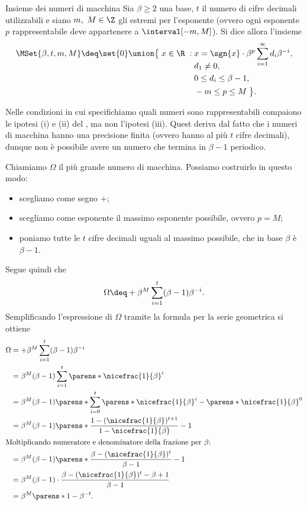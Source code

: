 \begin{definition}
    {Insieme dei numeri di macchina}
    Sia $\beta \geq 2$ una base, $t$ il numero di cifre decimali utilizzabili e siano $m,\ M \in \Z$ gli estremi per l'esponente (ovvero ogni esponente $p$ rappresentabile deve appartenere a $\interval[{-m, M}]$). Si dice allora  l'insieme\[
        \MSet{\beta, t, m, M} \deq \set{0} \union
        \begin{aligned}[t]
            \big\{\; x \in \R \;:\; &x = \sgn{x}\cdot\beta^p\sum_{i=1}^\infty d_i\beta^{-i},\\[-1em]
            &d_1 \neq 0,\\
            &0 \leq d_i \leq \beta-1,\\ 
            &-m \leq p \leq M \;\big\}.
        \end{aligned}
    \] 
\end{definition}

\begin{remark}
    Nelle condizioni in cui specifichiamo quali numeri sono rappresentabili compaiono le ipotesi (i) e (ii) del , ma non l'ipotesi (iii). Quest deriva dal fatto che i numeri di macchina hanno una precisione finita (ovvero hanno al più $t$ cifre decimali), dunque non è possibile avere un numero che termina in $\beta-1$ periodico.
\end{remark}

 Chiamiamo $\Omega$ il più grande numero di macchina. Possiamo costruirlo in questo modo: \begin{itemize}
    \item scegliamo come segno $+$;
    \item scegliamo come esponente il massimo esponente possibile, ovvero $p = M$;
    \item poniamo tutte le $t$ cifre decimali uguali al massimo possibile, che in base $\beta$ è $\beta-1$. 
\end{itemize} Segue quindi che \[
    \Omega \deq +\beta^M\sum_{i=1}^t (\beta-1)\beta^{-i}.
\] Semplificando l'espressione di $\Omega$ tramite la formula per la serie geometrica si ottiene \begin{align*}
    \Omega &= +\beta^M\sum_{i=1}^t (\beta-1)\beta^{-i}\\
    &= \beta^M(\beta - 1) \sum_{i=1}^t \parens*{\nicefrac{1}{\beta}}^i \\
    &= \beta^M(\beta - 1) \parens*{\sum_{i=0}^t \parens*{\nicefrac{1}{\beta}}^i - \parens*{\nicefrac{1}{\beta}}^0}\\
    &= \beta^M(\beta - 1) \parens*{\frac{1 - (\nicefrac{1}{\beta})^{t+1}}{1 - \nicefrac{1}{\beta}} - 1}\\
    \intertext{Moltiplicando numeratore e denominatore della frazione per $\beta$:}
    &= \beta^M(\beta - 1) \parens*{\frac{\beta - (\nicefrac{1}{\beta})^{t}}{\beta - 1} - 1}\\
    &= \beta^M(\beta - 1) \cdot \frac{\beta - (\nicefrac{1}{\beta})^{t} - \beta + 1}{\beta - 1}\\
    &= \beta^M \parens*{1 - \beta^{-t}}.
\end{align*}

